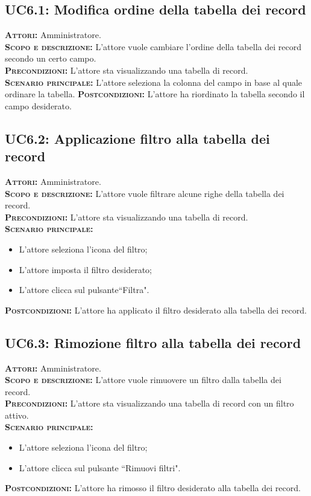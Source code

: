 \subsection{UC6.1: Modifica ordine della tabella dei record}
\label{sec:UC61}
\textsc{\textbf{Attori:}} Amministratore.\\
\textsc{\textbf{Scopo e descrizione:}} L'attore vuole cambiare l'ordine della tabella dei record secondo un certo campo.\\
\textsc{\textsc{\textbf{Precondizioni:}}} L'attore sta visualizzando una tabella di record.\\
\textsc{\textbf{Scenario principale:}} L'attore seleziona la colonna del campo in base al quale ordinare la tabella.
\textsc{\textbf{Postcondizioni:}} L'attore ha riordinato la tabella secondo il campo desiderato.

\subsection{UC6.2: Applicazione filtro alla tabella dei record}
\label{sec:UC62}
\textsc{\textbf{Attori:}} Amministratore.\\
\textsc{\textbf{Scopo e descrizione:}} L'attore vuole filtrare alcune righe della tabella dei record.\\
\textsc{\textsc{\textbf{Precondizioni:}}} L'attore sta visualizzando una tabella di record.\\
\textsc{\textbf{Scenario principale:}} 
\begin{itemize}
    \item L'attore seleziona l'icona del filtro;
    \item L'attore imposta il filtro desiderato;
    \item L'attore clicca sul pulsante``Filtra".
\end{itemize}
\textsc{\textbf{Postcondizioni:}} L'attore ha applicato il filtro desiderato alla tabella dei record.

\subsection{UC6.3: Rimozione filtro alla tabella dei record}
\label{sec:UC63}
\textsc{\textbf{Attori:}} Amministratore.\\
\textsc{\textbf{Scopo e descrizione:}} L'attore vuole rimuovere un filtro dalla tabella dei record.\\
\textsc{\textsc{\textbf{Precondizioni:}}} L'attore sta visualizzando una tabella di record con un filtro attivo.\\
\textsc{\textbf{Scenario principale:}} 
\begin{itemize}
    \item L'attore seleziona l'icona del filtro;
    \item L'attore clicca sul pulsante ``Rimuovi filtri".
\end{itemize}
\textsc{\textbf{Postcondizioni:}} L'attore ha rimosso il filtro desiderato alla tabella dei record.


